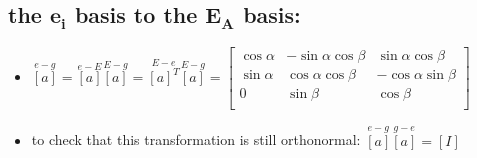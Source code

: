 \documentclass[10pt, letterpaper]{article}
\begin{document}
	\subsection{ the $\bm{e_i}$ basis to the $\bm{E_A}$ basis:}
		\begin{itemize}
			\item $\overset{e - g}{[a]} = \overset{e - E}{[a]} \overset{E - g}{[a]} = \overset{E- e}{[a]^T} \overset{E - g}{[a]} =
				\begin{bmatrix}		\cos \alpha & -\sin\alpha \cos \beta & \sin \alpha \cos \beta \\
								\sin \alpha & \cos \alpha \cos \beta & - \cos \alpha \sin \beta \\
								0 & \sin \beta & \cos \beta \\
							\end{bmatrix}$
			\item to check that this transformation is still orthonormal:  $\overset{e - g}{[a]} \overset{g - e}{[a]} = [I]$
		\end{itemize}
 
\end{document}
